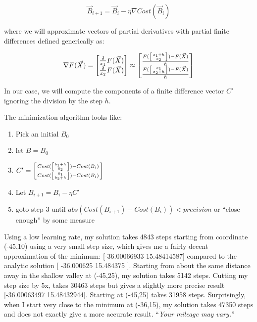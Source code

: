 \begin{fullwidth}
\[
\vec{B}_{i+1} = \vec{B}_i - \eta \nabla Cost(\vec{B}_i)
\]

\noindent where we will approximate vectors of partial derivatives with partial finite differences defined generically as:

\[
\nabla F(\vec{X}) =
\begin{bmatrix}
\frac{\delta}{x_1}{F(\vec{X})}\\
\frac{\delta}{x_2}{F(\vec{X})} \\
\end{bmatrix}
\approx
\begin{bmatrix}
\frac{F(\left[ x_1+h \above 0pt{x_2} \right]) - F(\vec{X})}{h} \\
\frac{F(\left[ x_1 \above 0pt{x_2+h} \right]) - F(\vec{X})}{h} \\
\end{bmatrix}
\]

\noindent In our case, we will compute the components of a finite difference vector $C'$ ignoring the division by the step $h$.

The minimization algorithm looks like:

\begin{enumerate}
\item Pick an initial $B_0$
\item let $B = B_0$
\item $C' = \left[ Cost(\left[ b_1+h \above 0pt{b_2} \right]) - Cost(B_i) \above 0pt Cost(\left[ b_1 \above 0pt{b_2+h} \right]) - Cost(B_i) \right]$
\item Let $B_{i+1} = B_i - \eta C'$
\item goto step 3 until $abs(Cost(B_{i+1})-Cost(B_i)) < precision$ or ``close enough'' by some measure
\end{enumerate}

Using a low learning rate, my solution takes 4843 steps starting from coordinate (-45,10) using a very small step size, which gives me a fairly decent approximation of the minimum: [-36.00066933  15.48414587] compared to the analytic solution [ -36.000625 15.484375 ]. Starting from about the same distance away in the shallow valley at (-45,25), my solution takes 5142 steps. Cutting my step size by 5x, takes 30463 steps but gives a slightly more precise result [-36.00063497  15.48432944]. Starting at (-45,25) takes 31958 steps. Surprisingly, when I start very close to the minimum at (-36,15), my solution takes 47350 steps and does not exactly give a more accurate result. ``{\em Your mileage may vary.}''


\end{fullwidth}
